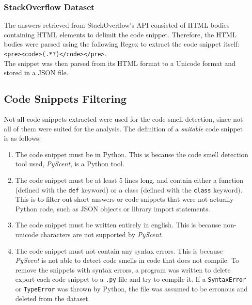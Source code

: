 \subsubsection{StackOverflow Dataset}
The answers retrieved from StackOverflow's API consisted of HTML bodies containing HTML elements to delimit the code snippet. Therefore, the HTML bodies were parsed using the following Regex to extract the code snippet itself: \texttt{<pre><code>(.*?)</code></pre>}. \\

The snippet was then parsed from its HTML format to a Unicode format and stored in a JSON file.


\subsection{Code Snippets Filtering}
Not all code snippets extracted were used for the code smell detection, since not all of them were suited for the analysis. The definition of a \textit{suitable} code snippet is as follows: \\

\begin{enumerate}
    \item The code snippet must be in Python. This is because the code smell detection tool used, \textit{PyScent}, is a Python tool. \\

    \item The code snippet must be at least 5 lines long, and contain either a function (defined with the \texttt{def} keyword) or a class (defined with the \texttt{class} keyword). This is to filter out short answers or code snippets that were not actually Python code, such as JSON objects or library import statements. \\

    \item The code snippet must be written entirely in english. This is because non-unicode characters are not supported by \textit{PyScent}. \\

    \item The code snippet must not contain any syntax errors. This is because \textit{PyScent} is not able to detect code smells in code that does not compile. To remove the snippets with syntax errors, a program was written to delete export each code snippet to a \texttt{.py} file and try to compile it. If a \texttt{SyntaxError} or \texttt{TypeError} was thrown by Python, the file was assumed to be erronous and deleted from the dataset. \\
\end{enumerate}

